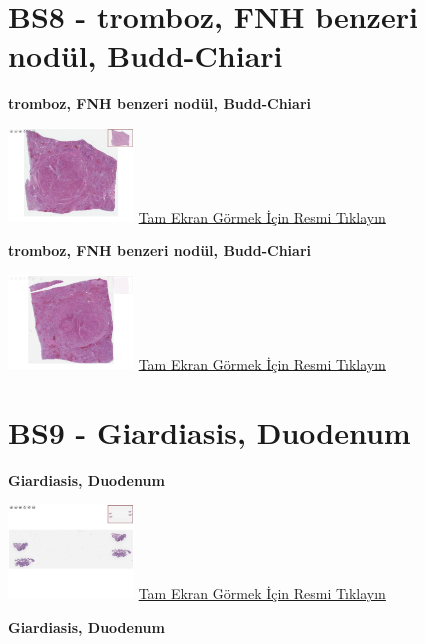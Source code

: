 \documentclass[
  letterpaper,
  DIV=11,
  numbers=noendperiod]{scrreprt}
\begin{document}
\hypertarget{sec-BS8}{%
\section{BS8 - tromboz, FNH benzeri nodül, Budd-Chiari}\label{sec-BS8}}

\textbf{tromboz, FNH benzeri nodül, Budd-Chiari}

\href{https://images.patolojiatlasi.com/BS8/HE1.html}{\includegraphics[width=0.25\textwidth,height=\textheight]{./screenshots/thumbnail_BS8-HE1.png}}
\href{https://images.patolojiatlasi.com/BS8/HE1.html}{Tam Ekran Görmek
İçin Resmi Tıklayın}

\textbf{tromboz, FNH benzeri nodül, Budd-Chiari}

\href{https://images.patolojiatlasi.com/BS8/HE2.html}{\includegraphics[width=0.25\textwidth,height=\textheight]{./screenshots/thumbnail_BS8-HE2.png}}
\href{https://images.patolojiatlasi.com/BS8/HE2.html}{Tam Ekran Görmek
İçin Resmi Tıklayın}

\hypertarget{sec-BS9}{%
\section{BS9 - Giardiasis, Duodenum}\label{sec-BS9}}

\textbf{Giardiasis, Duodenum}

\href{https://images.patolojiatlasi.com/BS9/HE1.html}{\includegraphics[width=0.25\textwidth,height=\textheight]{./screenshots/thumbnail_BS9-HE1.png}}
\href{https://images.patolojiatlasi.com/BS9/HE1.html}{Tam Ekran Görmek
İçin Resmi Tıklayın}

\textbf{Giardiasis, Duodenum}
\end{document}
